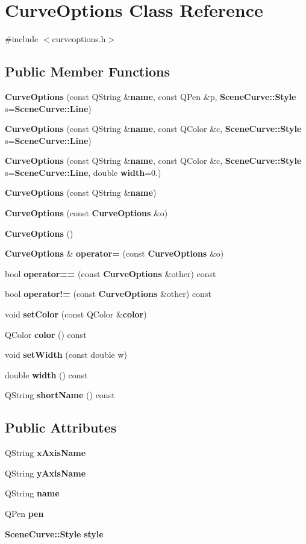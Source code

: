 \section{Curve\+Options Class Reference}
\label{classCurveOptions}


{\ttfamily \#include $<$curveoptions.\+h$>$}

\subsection*{Public Member Functions}
\begin{DoxyCompactItemize}
\item 
{\bf Curve\+Options} (const Q\+String \&{\bf name}, const Q\+Pen \&p, {\bf Scene\+Curve\+::\+Style} s={\bf Scene\+Curve\+::\+Line})
\item 
{\bf Curve\+Options} (const Q\+String \&{\bf name}, const Q\+Color \&c, {\bf Scene\+Curve\+::\+Style} s={\bf Scene\+Curve\+::\+Line})
\item 
{\bf Curve\+Options} (const Q\+String \&{\bf name}, const Q\+Color \&c, {\bf Scene\+Curve\+::\+Style} s={\bf Scene\+Curve\+::\+Line}, double {\bf width}=0.)
\item 
{\bf Curve\+Options} (const Q\+String \&{\bf name})
\item 
{\bf Curve\+Options} (const {\bf Curve\+Options} \&o)
\item 
{\bf Curve\+Options} ()
\item 
{\bf Curve\+Options} \& {\bf operator=} (const {\bf Curve\+Options} \&o)
\item 
bool {\bf operator==} (const {\bf Curve\+Options} \&other) const 
\item 
bool {\bf operator!=} (const {\bf Curve\+Options} \&other) const 
\item 
void {\bf set\+Color} (const Q\+Color \&{\bf color})
\item 
Q\+Color {\bf color} () const 
\item 
void {\bf set\+Width} (const double w)
\item 
double {\bf width} () const 
\item 
Q\+String {\bf short\+Name} () const 
\end{DoxyCompactItemize}
\subsection*{Public Attributes}
\begin{DoxyCompactItemize}
\item 
Q\+String {\bf x\+Axis\+Name}
\item 
Q\+String {\bf y\+Axis\+Name}
\item 
Q\+String {\bf name}
\item 
Q\+Pen {\bf pen}
\item 
{\bf Scene\+Curve\+::\+Style} {\bf style}
\end{DoxyCompactItemize}


